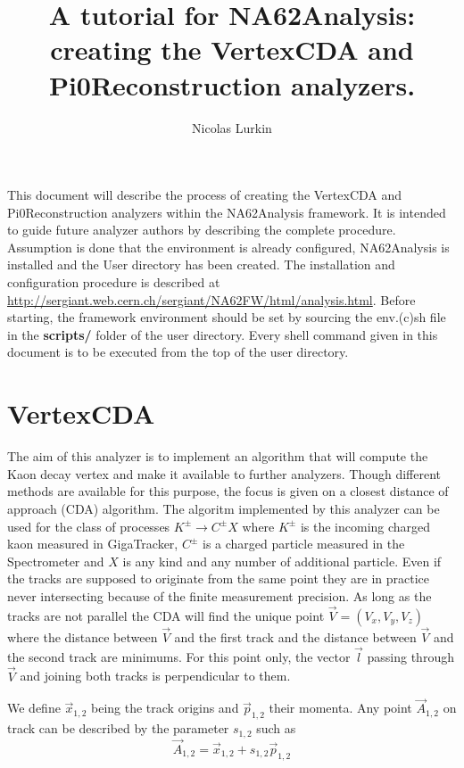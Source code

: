 \documentclass{article}
\title{A tutorial for NA62Analysis: creating the VertexCDA and
Pi0Reconstruction analyzers.}
\author{Nicolas Lurkin}
\renewcommand{\path}[1]{\textbf{#1}}
\begin{document}
\maketitle
\footnotesize
This document will describe the process of creating the VertexCDA and
Pi0Reconstruction analyzers within the NA62Analysis framework. It is intended to
guide future analyzer authors by describing the complete procedure. Assumption
is done that the environment is already configured, NA62Analysis is installed
and the User directory has been created. The installation and configuration
procedure is described at
\url{http://sergiant.web.cern.ch/sergiant/NA62FW/html/analysis.html}.
Before starting, the framework environment should be set by sourcing the
env.(c)sh file in the \path{scripts/} folder of the user directory. Every shell command
given in this document is to be executed from the top of the user directory.

\section{VertexCDA}

\newcommand{\p}[1]{\vec{p}_{#1}}
\newcommand{\ap}[1]{|\vec{p}_{#1}|^2}
\newcommand{\lv}{\vec{l}}
\newcommand{\lz}{\vec{l}_{0}}
\newcommand{\C}[1]{\vec{A}_{#1}}
\newcommand{\x}[1]{\vec{x}_{#1}}

The aim of this analyzer is to implement an algorithm that will compute the Kaon
decay vertex and make it available to further analyzers. Though different
methods are available for this purpose, the focus is given on a closest distance
of approach (CDA) algorithm. The algoritm implemented by this analyzer can be
used for the class of processes $K^\pm\to C^\pm X$ where $K^\pm$ is the
incoming charged kaon measured in GigaTracker, $C^\pm$ is a charged particle
measured in the Spectrometer and $X$ is any kind and any number of additional particle. Even if the
tracks are supposed to originate from the same point they are in practice never intersecting
because of the finite measurement precision. As long as the tracks are not parallel the CDA will
find the unique point $\vec{V}=(V_x,V_y,V_z)$ where the distance between $\vec{V}$ and the first
track and the distance between $\vec{V}$ and the second track are minimums. For this point only,
the vector $\lv$ passing through $\vec{V}$ and joining both tracks is perpendicular to
them.

We define $\vec{x}_{1,2}$ being the track origins and $\p{1,2}$ their
momenta. Any point $\C{1,2}$ on track can be described by the parameter $s_{1,2}$ such as
\begin{equation}
	\C{1,2} = \x{1,2} + s_{1,2} \p{1,2}
\end{equation}
\end{document}
